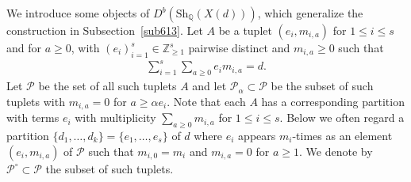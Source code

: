 \documentclass [11pt,oneside,a4paper,mathscr]{amsart}
\theoremstyle{definition}
\renewcommand{\leq}{\leqslant}
\renewcommand{\geq}{\geqslant}
\begin{document}
We introduce some objects of $D^b(\mathrm{Sh}_{\mathbb{Q}}(X(d)))$, 
which generalize the construction in Subsection~\ref{sub613}. 
Let $A$ be a tuplet $(e_i, m_{i,a})$ for $1\leq i\leq s$ and for $a\geq 0$, with $(e_i)_{i=1}^s\in \mathbb{Z}_{\geq 1}^s$ pairwise distinct and $m_{i,a}\geq 0$ such that 
\begin{align*}\sum_{i=1}^s \sum_{a\geq 0}e_im_{i,a}=d.
\end{align*}
Let $\mathscr{P}$ be the set of all such tuplets $A$ and let $\mathscr{P}_\alpha\subset \mathscr{P}$ be the subset of such tuplets with $m_{i,a}=0$ for $a\geq \alpha e_i$. Note that each $A$ has a corresponding partition with terms $e_i$ with multiplicity $\sum_{a\geq 0}m_{i,a}$ for $1\leq i\leq s$.
Below we often regard a partition 
$\{d_1, \ldots, d_k\}=\{e_1, \ldots, e_s\}$ of $d$ 
where $e_i$ appears $m_i$-times
as an element $(e_i, m_{i, a})$ of
$\mathscr{P}$ such that $m_{i, 0}=m_i$ and $m_{i, a}=0$ 
for $a\geq 1$. 
We denote by $\mathscr{P}^{\circ} \subset \mathscr{P}$ 
the subset of such tuplets. 
\end{document}
